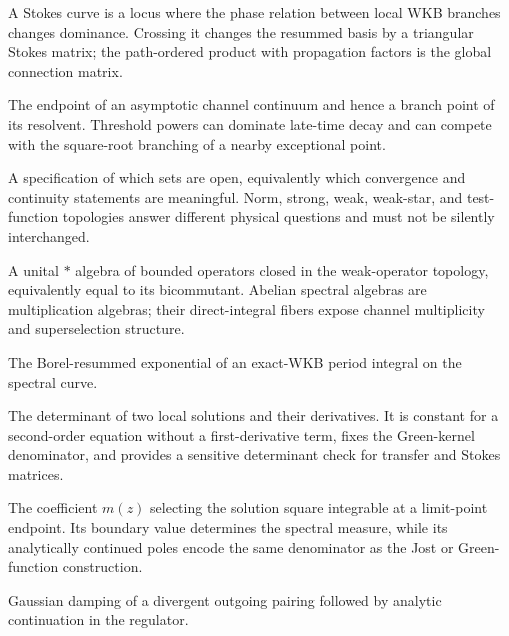 \begin{description}[style=nextline]
  \item[Stokes curve and Stokes matrix.]
  A Stokes curve is a locus where the phase relation between local WKB
  branches changes dominance.  Crossing it changes the resummed basis by a
  triangular Stokes matrix; the path-ordered product with propagation factors
  is the global connection matrix.

  \item[Threshold.]
  The endpoint of an asymptotic channel continuum and hence a branch point of
  its resolvent.  Threshold powers can dominate late-time decay and can
  compete with the square-root branching of a nearby exceptional point.

  \item[Topology.]
  A specification of which sets are open, equivalently which convergence and
  continuity statements are meaningful.  Norm, strong, weak, weak-star, and
  test-function topologies answer different physical questions and must not
  be silently interchanged.

  \item[\vN\ algebra.]
  A unital $*$ algebra of bounded operators closed in the weak-operator
  topology, equivalently equal to its bicommutant.  Abelian spectral algebras
  are multiplication algebras; their direct-integral fibers expose channel
  multiplicity and superselection structure.

  \item[Voros symbol.] The Borel-resummed exponential of an exact-WKB period
  integral on the spectral curve.

  \item[Wronskian.]
  The determinant of two local solutions and their derivatives.  It is
  constant for a second-order equation without a first-derivative term, fixes
  the Green-kernel denominator, and provides a sensitive determinant check
  for transfer and Stokes matrices.

  \item[Weyl--Titchmarsh function.]
  The coefficient $m(z)$ selecting the solution square integrable at a
  limit-point endpoint.  Its boundary value determines the spectral measure,
  while its analytically continued poles encode the same denominator as the
  Jost or Green-function construction.

  \item[Zel'dovich regularization.] Gaussian damping of a divergent outgoing
  pairing followed by analytic continuation in the regulator.
\end{description}
